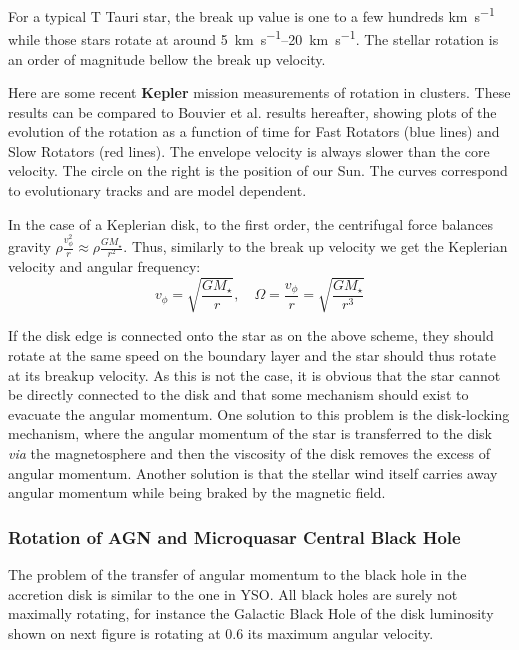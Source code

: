\documentclass[10pt,a4paper,english]{article}
\begin{document}
For a typical T Tauri star, the break up value is one to a few
hundreds \si{\km\per\s} while those stars rotate at around
\SIrange{5}{20}{\km\per\s}. The stellar rotation is an order of
magnitude bellow the break up velocity.

Here are some recent \textbf{Kepler} mission measurements of rotation
in clusters.   These results can be compared to
Bouvier et al. results hereafter, showing plots of the evolution of
the rotation as a function of time for Fast Rotators (blue lines) and
Slow Rotators (red lines). The envelope velocity is always slower than
the core velocity. The circle on the right is the position of our
Sun. The curves correspond to evolutionary tracks and are model
dependent.


In the case of a Keplerian disk, to the first order, the centrifugal
force balances gravity
$\rho \frac{v_\phi^2}{r} \approx \rho \frac{GM_\star}{r^2}$. Thus,
similarly to the break up velocity we get the Keplerian velocity and
angular frequency:
\begin{equation}
  v_\phi = \sqrt{\frac{GM_\star}{r}}, \quad \Omega = \frac{v_\phi}{r} = \sqrt{\frac{GM_\star}{r^3}}
\end{equation}

If the disk edge is connected onto the star as on the above scheme,
they should rotate at the same speed on the boundary layer and the
star should thus rotate at its breakup velocity. As this is not the
case, it is obvious that the star cannot be directly connected to the
disk and that some mechanism should exist to evacuate the angular
momentum. One solution to this problem is the disk-locking mechanism,
where the angular momentum of the star is transferred to the disk
\emph{via} the magnetosphere and then the viscosity of the disk
removes the excess of angular momentum. Another solution is that the
stellar wind itself carries away angular momentum while being braked
by the magnetic field.
\subsubsection{Rotation of AGN and Microquasar Central Black Hole}
The problem of the transfer of angular momentum to the black hole in
the accretion disk is similar to the one in YSO. All black holes are
surely not maximally rotating, for instance the Galactic Black Hole of
the disk luminosity shown on next figure is rotating at 0.6 its
maximum angular velocity.
\end{document}
